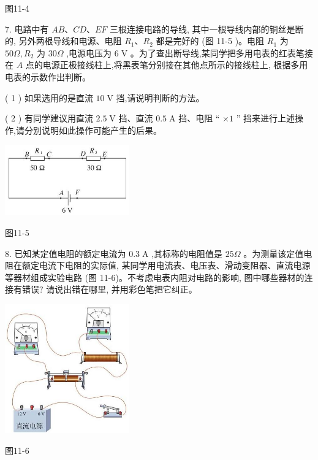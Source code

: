 \documentclass[10pt]{article}
\begin{document}
图11-4

7. 电路中有 \({AB}\text{、}{CD}\text{、}{EF}\) 三根连接电路的导线, 其中一根导线内部的铜丝是断的, 另外两根导线和电源、电阻 \({R}_{1}\text{、}{R}_{2}\) 都是完好的 (图 11-5 )。电阻 \({R}_{1}\) 为 \({50\Omega },{R}_{2}\) 为 \({30\Omega }\) ,电源电压为 \(6\mathrm{\;V}\) 。为了查出断导线,某同学把多用电表的红表笔接在 \(A\) 点的电源正极接线柱上,将黑表笔分别接在其他点所示的接线柱上, 根据多用电表的示数作出判断。

( 1 ) 如果选用的是直流 \({10}\mathrm{\;V}\) 挡,请说明判断的方法。

( 2 ) 有同学建议用直流 \({2.5}\mathrm{\;V}\) 挡、直流 \({0.5}\mathrm{\;A}\) 挡、电阻 “ \(\times 1\) ” 挡来进行上述操作,请分别说明如此操作可能产生的后果。

\begin{center}
\includegraphics[max width=0.4\textwidth]{images/01911d5f-8e38-70c0-b5b8-2b399bd115b6_81_945235.jpg}
\end{center}

图11-5

8. 已知某定值电阻的额定电流为 \({0.3}\mathrm{\;A}\) ,其标称的电阻值是 \({25\Omega }\) 。为测量该定值电阻在额定电流下电阻的实际值, 某同学用电流表、电压表、滑动变阻器、直流电源等器材组成实验电路 (图 11-6)。不考虑电表内阻对电路的影响, 图中哪些器材的连接有错误? 请说出错在哪里, 并用彩色笔把它纠正。

\begin{center}
\includegraphics[max width=0.4\textwidth]{images/01911d5f-8e38-70c0-b5b8-2b399bd115b6_81_691431.jpg}
\end{center}

图11-6
\end{document}
